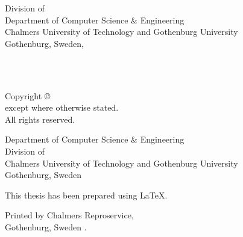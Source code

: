 \begin{center}
Division of \division \\
Department of Computer Science \& Engineering\\
Chalmers University of Technology and Gothenburg University\\
Gothenburg, Sweden, \currentyear \\
\end{center}

\newpage
\thispagestyle{plain}

\vspace{2cm} \noindent \textbf
\mytitle\\

\noindent
\textsc{\authorname}\\

\vfill

\noindent
Copyright \copyright \currentyear \space \authorname \\
except where otherwise stated. \\
All rights reserved. \vspace{1cm}

\noindent \reportNoText
Department of Computer Science \& Engineering\\
Division of \division \\
Chalmers University of Technology and Gothenburg University\\
Gothenburg, Sweden\\
\vspace{1cm}

\noindent This thesis has been prepared using \LaTeX.

\noindent
Printed by Chalmers Reproservice,\\
Gothenburg, Sweden \currentyear.